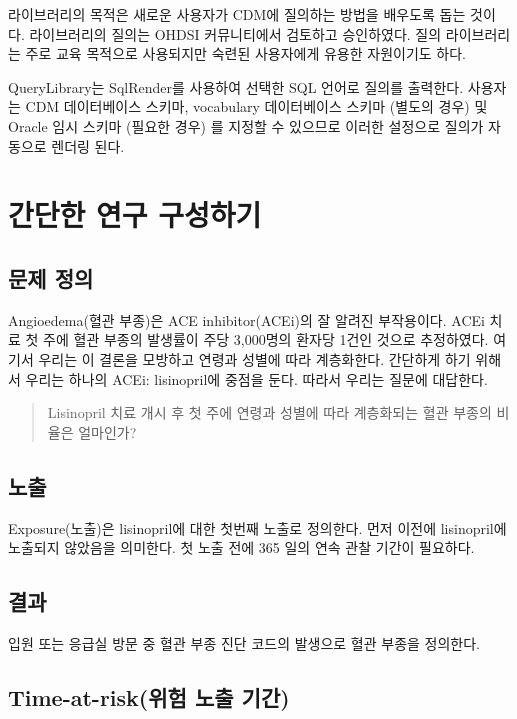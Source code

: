 \documentclass[11pt]{book}
\theoremstyle{definition}
\theoremstyle{definition}
\theoremstyle{definition}
\theoremstyle{remark}
\begin{document}
라이브러리의 목적은 새로운 사용자가 CDM에 질의하는 방법을 배우도록 돕는
것이다. 라이브러리의 질의는 OHDSI 커뮤니티에서 검토하고 승인하였다. 질의
라이브러리는 주로 교육 목적으로 사용되지만 숙련된 사용자에게 유용한
자원이기도 하다.

QueryLibrary는 SqlRender를 사용하여 선택한 SQL 언어로 질의를 출력한다.
사용자는 CDM 데이터베이스 스키마, vocabulary 데이터베이스 스키마 (별도의
경우) 및 Oracle 임시 스키마 (필요한 경우) 를 지정할 수 있으므로 이러한
설정으로 질의가 자동으로 렌더링 된다.

\section{간단한 연구 구성하기}\label{--}

\subsection{문제 정의}\label{-}

Angioedema(혈관 부종)은 ACE inhibitor(ACEi)의 잘 알려진 부작용이다.
\citep{slater_1988} ACEi 치료 첫 주에 혈관 부종의 발생률이 주당
3,000명의 환자당 1건인 것으로 추정하였다. 여기서 우리는 이 결론을
모방하고 연령과 성별에 따라 계층화한다. 간단하게 하기 위해서 우리는
하나의 ACEi: lisinopril에 중점을 둔다. 따라서 우리는 질문에 대답한다.

\begin{quote}
Lisinopril 치료 개시 후 첫 주에 연령과 성별에 따라 계층화되는 혈관
부종의 비율은 얼마인가?
\end{quote}

\subsection{노출}

Exposure(노출)은 lisinopril에 대한 첫번째 노출로 정의한다. 먼저 이전에
lisinopril에 노출되지 않았음을 의미한다. 첫 노출 전에 365 일의 연속 관찰
기간이 필요하다.

\subsection{결과}

입원 또는 응급실 방문 중 혈관 부종 진단 코드의 발생으로 혈관 부종을
정의한다.

\subsection{Time-at-risk(위험 노출 기간)}\label{time-at-risk--}
\end{document}

